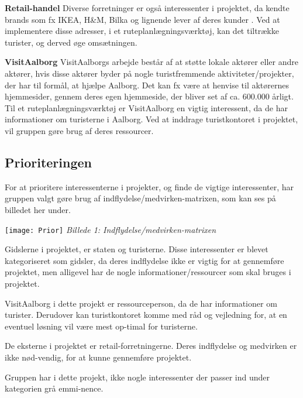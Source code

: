 \textbf{Retail-handel}\newline
Diverse forretninger er også interessenter i projektet, da kendte brands som fx IKEA, H\&M, Bilka og lignende lever af deres kunder \citep{PengeloseButikker}. Ved at implementere disse adresser, i et ruteplanlægningsværktøj, kan det tiltrække turister, og derved øge omsætningen. 

\textbf{VisitAalborg}\newline
VisitAalborgs arbejde består af at støtte lokale aktører eller andre aktører, hvis disse aktører byder på nogle turistfremmende aktiviteter/projekter, der har til formål, at hjælpe Aalborg. Det kan fx være at henvise til aktørernes hjemmesider, gennem deres egen hjemmeside, der bliver set af ca. 600.000 årligt. \citep{VA}
Til et ruteplanlægningsværktøj er VisitAalborg en vigtig interessent, da de har informationer om turisterne i Aalborg. Ved at inddrage turistkontoret i projektet, vil gruppen gøre brug af deres ressourcer. 

\subsection{Prioriteringen}
For at prioritere interessenterne i projekter, og finde de vigtige interessenter, har gruppen valgt gøre brug af indflydelse/medvirken-matrixen, som kan ses på billedet her under.

\texttt{[image: Prior]}
\textit{Billede 1: Indflydelse/medvirken-matrixen}\newline
 

Gidslerne i projektet, er staten og turisterne. Disse interessenter er blevet kategoriseret som gidsler, da deres indflydelse ikke er vigtig for at gennemføre projektet, men alligevel har de nogle informationer/ressourcer som skal bruges i projektet.

VisitAalborg i dette projekt er ressourceperson, da de har informationer om turister. Derudover kan turistkontoret komme med råd og vejledning for, at en eventuel løsning vil være mest op-timal for turisterne.   

De eksterne i projektet er retail-forretningerne. Deres indflydelse og medvirken er ikke nød-vendig, for at kunne gennemføre projektet. 

Gruppen har i dette projekt, ikke nogle interessenter der passer ind under kategorien grå emmi-nence. 

